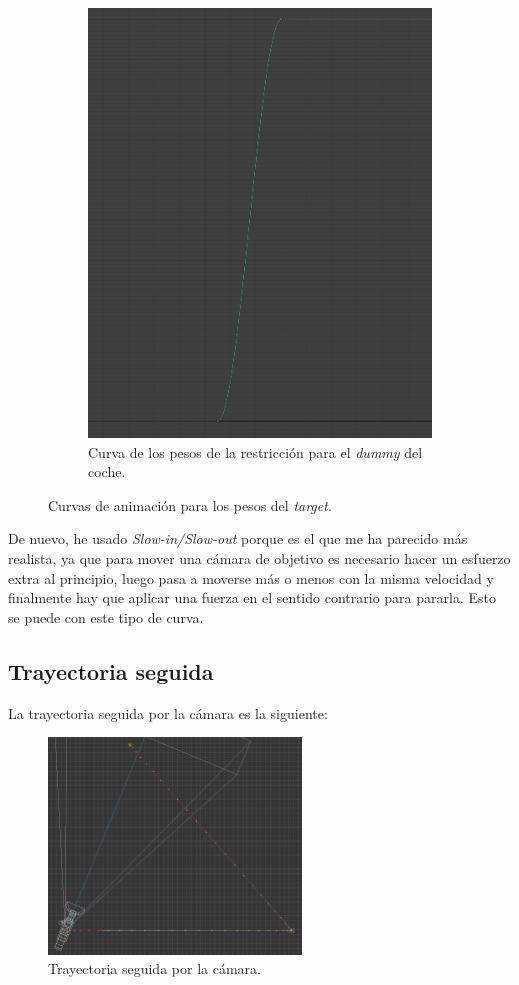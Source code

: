 \begin{figure}[H]
\begin{subfigure}[t]{0.48\textwidth}
        \includegraphics[width=\textwidth]{imagenes/camara/target/pos1.png}
        \caption{Curva de los pesos de la restricción para el \textit{dummy} del coche.}
    \end{subfigure}
    \caption{Curvas de animación para los pesos del \textit{target}.}
\end{figure}

De nuevo, he usado \textit{Slow-in/Slow-out} porque es el que me ha parecido más realista, ya que para mover una cámara de objetivo es necesario hacer un esfuerzo extra al principio, luego pasa a moverse más o menos con la misma velocidad y finalmente hay que aplicar una fuerza en el sentido contrario para pararla. Esto se puede con este tipo de curva.


\subsection{Trayectoria seguida}

La trayectoria seguida por la cámara es la siguiente:

\begin{figure}[H]
    \centering
   \includegraphics[width=0.6\textwidth]{imagenes/camara/trayectoria.png}
   \caption{Trayectoria seguida por la cámara.}
\end{figure}